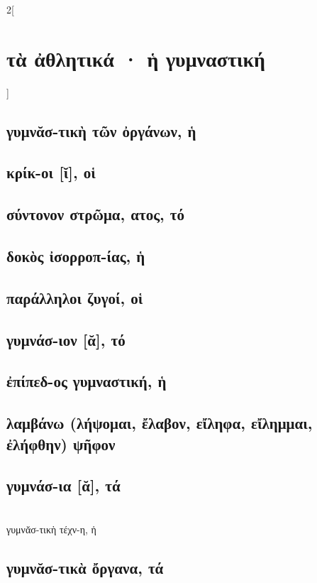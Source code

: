 \documentclass{book}
\begin{document}
\begin{multicols}{2}[\section{τὰ ἀθλητικά · ἡ γυμναστική}]
\subsection{γυμνᾰσ-τικὴ τῶν ὀργάνων, ἡ}
\subsection{κρίκ-οι [ῐ], οἱ}
\subsection{σύντονον στρῶμα, ατος, τό}
\subsection{δοκὸς ἰσορροπ-ίας, ἡ}
\subsection{παράλληλοι ζυγοί, οἱ}
\subsection{γυμνάσ-ιον [ᾰ], τό}
\subsection{ἐπίπεδ-ος γυμναστική, ἡ}
\subsection{λαμβάνω (λήψομαι, ἔλαβον, εἴληφα, εἴλημμαι, ἐλήφθην) ψῆφον}
\subsection{γυμνάσ-ια [ᾰ], τά}
 ~\\
γυμνᾰσ-τικὴ τέχν-η, ἡ 
\subsection{γυμνᾰσ-τικὰ ὄργανα, τά}

\end{multicols}
\end{document}
